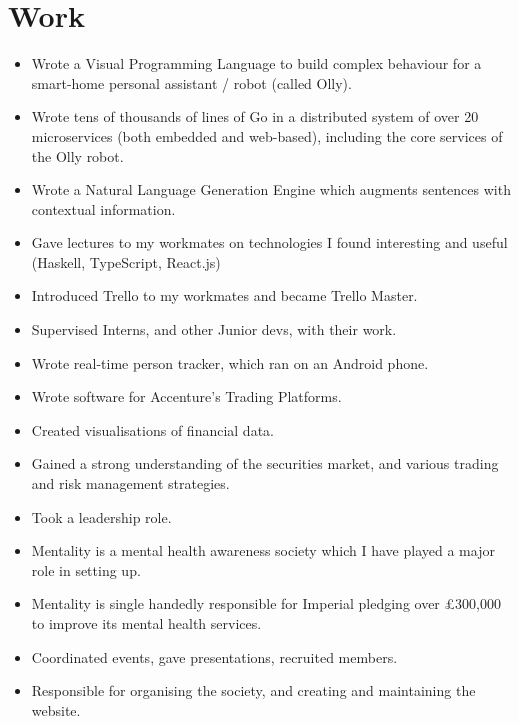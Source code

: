 \documentclass{jcgcv}
\begin{document}
\begin{column}

\section{Work}

\begin{itemize}
  \item Wrote a Visual Programming Language to build complex behaviour for a smart-home personal assistant / robot (called Olly).
  \item Wrote tens of thousands of lines of Go in a distributed system of over 20 microservices (both embedded and web-based), including the core services of the Olly robot.
  \item Wrote a Natural Language Generation Engine which augments sentences with contextual information.
  \item Gave lectures to my workmates on technologies I found interesting and useful (Haskell, TypeScript, React.js)
  \item Introduced Trello to my workmates and became Trello Master.
  \item Supervised Interns, and other Junior devs, with their work.
\end{itemize}

\begin{itemize}
  \item Wrote real-time person tracker, which ran on an Android phone.
\end{itemize}

\begin{itemize}
  \item Wrote software for Accenture's Trading Platforms.
  \item Created visualisations of financial data.
  \item Gained a strong understanding of the securities market, and various trading and risk management strategies.
  \item Took a leadership role.
\end{itemize}

\begin{itemize}
  \item Mentality is a mental health awareness society which I have played a major role in setting up.
  \item Mentality is single handedly responsible for Imperial pledging over \pounds300,000 to improve its mental health services.
  \item Coordinated events, gave presentations, recruited members.
  \item Responsible for organising the society, and creating and maintaining the website.
\end{itemize}


\end{column}
\end{document}

